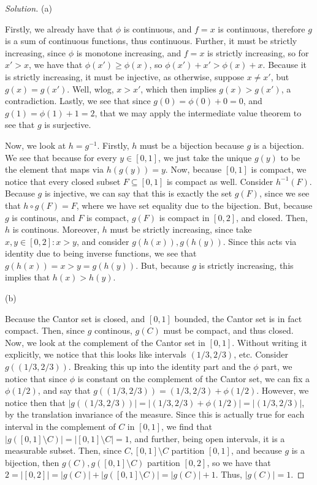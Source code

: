 \documentclass[10pt]{article}
\begin{document}
\begin{proof}[Solution]

(a)

Firstly, we already have that $\phi$ is continuous, and $f = x$ is continuous, therefore $g$ is a sum of continuous functions, thus continuous. Further, it must be strictly increasing, since $\phi$ is monotone increasing, and $f = x$ is strictly increasing, so for $x' > x$, we have that $\phi(x') \geq \phi(x)$, so $\phi(x') + x' > \phi(x) + x$. Because it is strictly increasing, it must be injective, as otherwise, suppose $x \not = x'$, but $g(x) = g(x')$. Well, wlog, $x > x'$, which then implies $g(x) > g(x')$, a contradiction. Lastly, we see that since $g(0) = \phi(0) + 0 = 0$, and $ g(1) = \phi(1) + 1 = 2$, that we may apply the intermediate value theorem to see that $g$ is surjective.

Now, we look at $h = g^{-1}$. Firstly, $h$ must be a bijection because $g$ is a bijection. We see that because for every $y \in [0,1]$, we just take the unique $g(y)$ to be the element that maps via $h(g(y)) = y$. Now, because $[0,1]$ is compact, we notice that every closed subset $F \subseteq [0,1]$ is compact as well. Consider $h^{-1}(F)$. Because $g$ is injective, we can say that this is exactly the set $g(F)$, since we see that $h \circ g (F) = F$, where we have set equality due to the bijection. But, because $g$ is continous, and $F$ is compact, $g(F)$ is compact in $[0,2]$, and closed. Then, $h$ is continous. Moreover, $h$ must be strictly increasing, since take $x, y \in [0,2] : x > y$, and consider $g(h(x)), g(h(y))$. Since this acts via identity due to being inverse functions, we see that $g(h(x)) = x > y = g(h(y))$. But, because $g$ is strictly increasing, this implies that $h(x) > h(y)$.

(b)

Because the Cantor set is closed, and $[0,1]$ bounded, the Cantor set is in fact compact. Then, since $g$ continous, $g(C)$ must be compact, and thus closed. Now, we look at the complement of the Cantor set in $[0,1]$. Without writing it explicitly, we notice that this looks like intervals $(1/3,2/3)$, etc. Consider $g((1/3,2/3))$. Breaking this up into the identity part and the $\phi$ part, we notice that since $\phi$ is constant on the complement of the Cantor set, we can fix a $\phi(1/2)$, and say that $g((1/3,2/3)) = (1/3,2/3) + \phi(1/2)$. However, we notice then that $|g((1/3,2/3))| = |(1/3,2/3) + \phi(1/2)| = |(1/3,2/3)|$, by the translation invariance of the measure. Since this is actually true for each interval in the complement of $C$ in $[0,1]$, we find that $|g([0,1] \setminus C)| = |[0,1] \setminus C| = 1$, and further, being open intervals, it is a measurable subset. Then, since $C, [0,1] \setminus C$ partition $[0,1]$, and because $g$ is a bijection, then $g(C), g([0,1] \setminus C)$ partition $[0,2]$, so we have that $2 = |[0,2]| = |g(C)| + |g([0,1] \setminus C)| = |g(C)| + 1$. Thus, $|g(C)| = 1$.


\end{proof}
\end{document}
